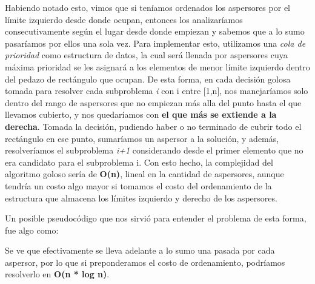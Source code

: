 \documentclass[./main.tex]{subfiles}
\begin{document}
Habiendo notado esto, vimos que si teníamos ordenados los aspersores por el límite izquierdo desde donde ocupan, entonces los analizaríamos consecutivamente según el lugar desde donde empiezan y sabemos que a lo sumo pasaríamos por ellos una sola vez. 
Para implementar esto, utilizamos una \textit{cola de prioridad} como estructura de datos, la cual será llenada por aspersores cuya máxima prioridad se les asignará a los elementos de menor límite izquierdo dentro del pedazo de rectángulo que ocupan. \newline
De esta forma, en cada decisión golosa tomada para resolver cada subproblema \textit{i} con i entre [1,n], nos manejaríamos solo dentro del rango de aspersores que no empiezan más alla del punto hasta el que llevamos cubierto, y nos quedaríamos con \textbf{el que más se extiende a la derecha}.  \newline
Tomada la decisión, pudiendo haber o no terminado de cubrir todo el rectángulo en ese punto, sumaríamos un aspersor a la solución, y además, resolveríamos el subproblema \textit{i+1} considerando desde el primer elemento que no era candidato para el subproblema {i}. Con esto hecho, la complejidad del algoritmo goloso sería de \textbf{O(n)}, lineal en la cantidad de aspersores, aunque tendría un costo algo mayor si tomamos el costo del ordenamiento de la estructura que almacena los límites izquierdo y derecho de los aspersores.

Un posible pseudocódigo que nos sirvió para entender el problema de esta forma, fue algo como: \newline


Se ve que efectivamente se lleva adelante a lo sumo una pasada por cada aspersor, por lo que si preponderamos el costo de ordenamiento, podríamos resolverlo en \textbf{O(n * log n)}. \newline
\end{document}
